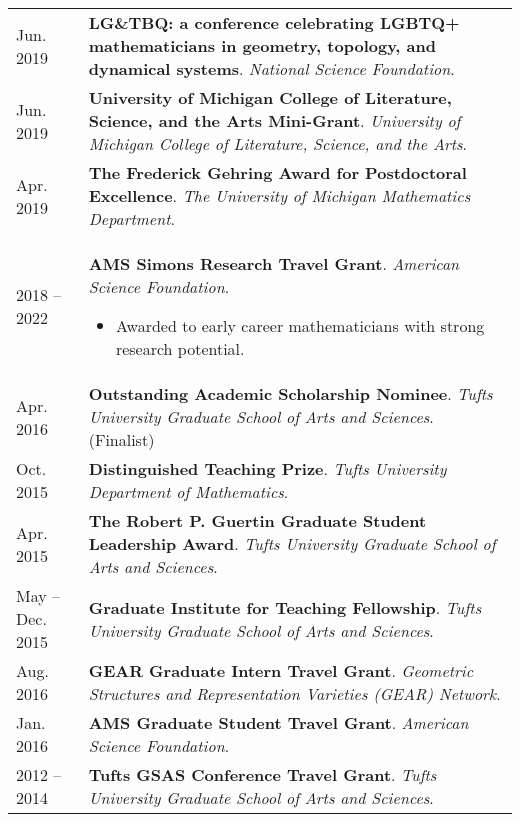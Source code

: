 
    \medskip


    \medskip
    
    \begin{center}
    {
    \renewcommand{\arraystretch}{1.5}
    \begin{longtable}{p{}  p{}}
     Jun.  2019 & \textbf{LG\&TBQ: a conference celebrating LGBTQ+ mathematicians in geometry, topology, and dynamical systems}. \textit{National Science Foundation}.  \\ 
 Jun.  2019 & \textbf{University of Michigan College of Literature, Science, and the Arts Mini-Grant}. \textit{University of Michigan College of Literature, Science, and the Arts}.  \\ 
 Apr.  2019 & \textbf{The Frederick Gehring Award for Postdoctoral Excellence}. \textit{The University of Michigan Mathematics Department}.  \\ 
   2018 --    2022 & \textbf{AMS Simons Research Travel Grant}. \textit{American Science Foundation}. 
        \hspace{-1em}

        {\small
        \begin{itemize}
        \setlength{\parindent}{0em}
        \item[] Awarded to early career mathematicians with strong research potential.
        \end{itemize}
        }
        \vspace{-1em}
         \\ 
 Apr.  2016 & \textbf{Outstanding Academic Scholarship Nominee}. \textit{Tufts University Graduate School of Arts and Sciences}. (Finalist) \\ 
 Oct.  2015 & \textbf{Distinguished Teaching Prize}. \textit{Tufts University Department of Mathematics}.  \\ 
 Apr.  2015 & \textbf{The Robert P. Guertin Graduate Student Leadership Award}. \textit{Tufts University Graduate School of Arts and Sciences}.  \\ 
 May  --  Dec.  2015 & \textbf{Graduate Institute for Teaching Fellowship}. \textit{Tufts University Graduate School of Arts and Sciences}.  \\ 
 Aug.  2016 & \textbf{GEAR Graduate Intern Travel Grant}. \textit{Geometric Structures and Representation Varieties (GEAR) Network}.  \\ 
 Jan.  2016 & \textbf{AMS Graduate Student Travel Grant}. \textit{American Science Foundation}.  \\ 
   2012 --    2014 & \textbf{Tufts GSAS Conference Travel Grant}. \textit{Tufts University Graduate School of Arts and Sciences}.  
    \end{longtable}
    } 
    \end{center}

    \vspace{-1em}
    